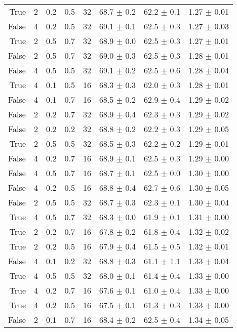 \begin{table}[h]
\begin{tabular}{rrllrlll}
True & 2 & 0.2 & 0.5 & 32 & 68.7 $\pm$ 0.2 & 62.2 $\pm$ 0.1 & 1.27 $\pm$ 0.01 \\
False & 4 & 0.2 & 0.5 & 32 & 69.1 $\pm$ 0.1 & 62.5 $\pm$ 0.3 & 1.27 $\pm$ 0.03 \\
True & 2 & 0.5 & 0.7 & 32 & 68.9 $\pm$ 0.0 & 62.5 $\pm$ 0.3 & 1.27 $\pm$ 0.01 \\
False & 2 & 0.5 & 0.7 & 32 & 69.0 $\pm$ 0.3 & 62.5 $\pm$ 0.3 & 1.28 $\pm$ 0.01 \\
False & 4 & 0.5 & 0.5 & 32 & 69.1 $\pm$ 0.2 & 62.5 $\pm$ 0.6 & 1.28 $\pm$ 0.04 \\
True & 4 & 0.1 & 0.5 & 16 & 68.3 $\pm$ 0.3 & 62.0 $\pm$ 0.3 & 1.28 $\pm$ 0.01 \\
False & 4 & 0.1 & 0.7 & 16 & 68.5 $\pm$ 0.2 & 62.9 $\pm$ 0.4 & 1.29 $\pm$ 0.02 \\
False & 2 & 0.2 & 0.7 & 32 & 68.9 $\pm$ 0.4 & 62.3 $\pm$ 0.3 & 1.29 $\pm$ 0.02 \\
False & 2 & 0.2 & 0.2 & 32 & 68.8 $\pm$ 0.2 & 62.2 $\pm$ 0.3 & 1.29 $\pm$ 0.05 \\
True & 2 & 0.5 & 0.5 & 32 & 68.5 $\pm$ 0.3 & 62.2 $\pm$ 0.2 & 1.29 $\pm$ 0.01 \\
False & 4 & 0.2 & 0.7 & 16 & 68.9 $\pm$ 0.1 & 62.5 $\pm$ 0.3 & 1.29 $\pm$ 0.00 \\
False & 4 & 0.5 & 0.7 & 16 & 68.7 $\pm$ 0.1 & 62.5 $\pm$ 0.0 & 1.30 $\pm$ 0.00 \\
False & 4 & 0.2 & 0.5 & 16 & 68.8 $\pm$ 0.4 & 62.7 $\pm$ 0.6 & 1.30 $\pm$ 0.05 \\
False & 2 & 0.5 & 0.5 & 32 & 68.7 $\pm$ 0.3 & 62.3 $\pm$ 0.1 & 1.30 $\pm$ 0.04 \\
True & 4 & 0.5 & 0.7 & 32 & 68.3 $\pm$ 0.0 & 61.9 $\pm$ 0.1 & 1.31 $\pm$ 0.00 \\
True & 2 & 0.2 & 0.7 & 16 & 67.8 $\pm$ 0.2 & 61.8 $\pm$ 0.4 & 1.32 $\pm$ 0.02 \\
True & 2 & 0.2 & 0.5 & 16 & 67.9 $\pm$ 0.4 & 61.5 $\pm$ 0.5 & 1.32 $\pm$ 0.01 \\
False & 4 & 0.1 & 0.2 & 32 & 68.8 $\pm$ 0.3 & 61.1 $\pm$ 1.1 & 1.33 $\pm$ 0.04 \\
True & 4 & 0.5 & 0.5 & 32 & 68.0 $\pm$ 0.1 & 61.4 $\pm$ 0.4 & 1.33 $\pm$ 0.00 \\
True & 4 & 0.2 & 0.7 & 16 & 67.6 $\pm$ 0.1 & 61.0 $\pm$ 0.4 & 1.33 $\pm$ 0.00 \\
True & 4 & 0.2 & 0.5 & 16 & 67.5 $\pm$ 0.1 & 61.3 $\pm$ 0.3 & 1.33 $\pm$ 0.00 \\
False & 2 & 0.1 & 0.7 & 16 & 68.4 $\pm$ 0.2 & 62.5 $\pm$ 0.4 & 1.34 $\pm$ 0.05 \\

\end{tabular}
\end{table}
